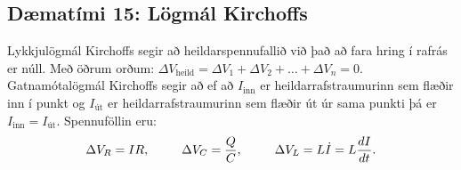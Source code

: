 \ifdefined \wholebook \else\documentclass[oneside]{book}\usepackage{EdlBook}\graphicspath{{figures/}}
\begin{document}
\newpage

\subsection*{Dæmatími 15: Lögmál Kirchoffs}

\begin{tcolorbox}
Lykkjulögmál Kirchoffs segir að heildarspennufallið við það að fara hring í rafrás er núll. Með öðrum orðum: $\Delta V_{\text{heild}} = \Delta V_1 + \Delta V_2 + \ldots + \Delta V_n = 0$. Gatnamótalögmál Kirchoffs segir að ef að $I_{\text{inn}}$ er heildarrafstraumurinn sem flæðir inn í punkt og $I_{\text{út}}$ er heildarrafstraumurinn sem flæðir út úr sama punkti þá er $I_{\text{inn}} = I_{\text{út}}$. Spennuföllin eru:
\begin{align*}
    \Delta V_R = IR, \hspace{0.9cm} \Delta V_C = \frac{Q}{C}, \hspace{0.9cm} \Delta V_L = L \dot{I} = L \frac{dI}{dt}.
\end{align*}
\end{tcolorbox}
\end{document}

